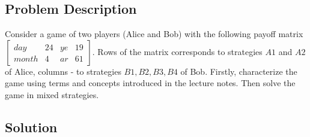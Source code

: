 \documentclass[
	a4paper, %
	11pt, %
]{CSUniSchoolLabReport}
\begin{document}
\subsection{Problem Description}\label{writeup01}

    Consider a game of two players (Alice and Bob) with the following payoff matrix
    $\begin{bmatrix}
        day & 24 & ye & 19 \\
        month & 4 & ar & 61
    \end{bmatrix}
    $. Rows of the matrix corresponds to strategies $A1$ and $A2$ of Alice, columns - to strategies $B1, B2, B3, B4$ of Bob.
    Firstly, characterize the game using terms and concepts introduced in the lecture notes. Then solve the game in mixed strategies.


\subsection{Solution}\label{solution01}
\end{document}
